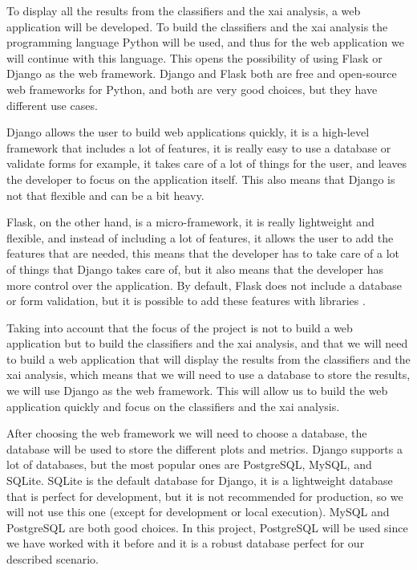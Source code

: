 To display all the results from the classifiers and the \ac{xai} analysis, a web application will be developed. To build the classifiers and the \ac{xai} analysis the programming language Python will be used, and thus for the web application we will continue with this language. This opens the possibility of using Flask or Django as the web framework. Django and Flask both are free and open-source web frameworks for Python, and both are very good choices, but they have different use cases.

Django allows the user to build web applications quickly, it is a high-level framework that includes a lot of features, it is really easy to use a database or validate forms for example, it takes care of a lot of things for the user, and leaves the developer to focus on the application itself. This also means that Django is not that flexible and can be a bit heavy.

Flask, on the other hand, is a micro-framework, it is really lightweight and flexible, and instead of including a lot of features, it allows the user to add the features that are needed, this means that the developer has to take care of a lot of things that Django takes care of, but it also means that the developer has more control over the application. By default, Flask does not include a database or form validation, but it is possible to add these features with libraries \cite{noauthor_foreword_nodate}.

Taking into account that the focus of the project is not to build a web application but to build the classifiers and the \ac{xai} analysis, and that we will need to build a web application that will display the results from the classifiers and the \ac{xai} analysis, which means that we will need to use a database to store the results, we will use Django as the web framework. This will allow us to build the web application quickly and focus on the classifiers and the \ac{xai} analysis.

After choosing the web framework we will need to choose a database, the database will be used to store the different plots and metrics. Django supports a lot of databases, but the most popular ones are PostgreSQL, MySQL, and SQLite. SQLite is the default database for Django, it is a lightweight database that is perfect for development, but it is not recommended for production, so we will not use this one (except for development or local execution). MySQL and PostgreSQL are both good choices. In this project, PostgreSQL will be used since we have worked with it before and it is a robust database perfect for our described scenario.

